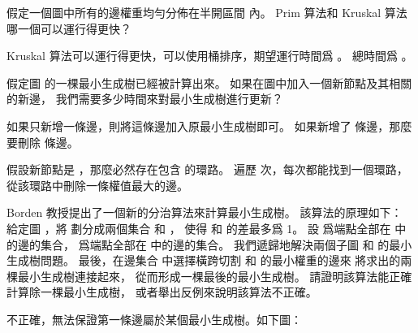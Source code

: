 \startEXERCISE\DIFFICULT
假定一個圖中所有的邊權重均勻分佈在半開區間 \m{[0,1)} 內。
 Prim 算法和 Kruskal 算法哪一個可以運行得更快？
\stopEXERCISE

\startANSWER
Kruskal 算法可以運行得更快，可以使用桶排序，期望運行時間爲 。
總時間爲 。
\stopANSWER

\startEXERCISE\DIFFICULT
假定圖  的一棵最小生成樹已經被計算出來。
如果在圖中加入一個新節點及其相關的新邊，
我們需要多少時間來對最小生成樹進行更新？
\stopEXERCISE

\startANSWER
如果只新增一條邊，則將這條邊加入原最小生成樹即可。
如果新增了  條邊，那麼要刪除  條邊。

假設新節點是 ，那麼必然存在包含  的環路。
遍歷  次，每次都能找到一個環路，從該環路中刪除一條權值最大的邊。
\stopANSWER

\startEXERCISE
Borden 教授提出了一個新的分治算法來計算最小生成樹。
該算法的原理如下：
給定圖 ，將  劃分成兩個集合  和 ，
使得  和  的差最多爲 1。
設  爲端點全部在  中的邊的集合，
  爲端點全部在  中的邊的集合。
我們遞歸地解決兩個子圖  和  的最小生成樹問題。
最後，在邊集合  中選擇橫跨切割  和  的最小權重的邊來
將求出的兩棵最小生成樹連接起來，
從而形成一棵最後的最小生成樹。
請證明該算法能正確計算除一棵最小生成樹，
或者舉出反例來說明該算法不正確。
\stopEXERCISE

\startANSWER
不正確，無法保證第一條邊屬於某個最小生成樹。如下圖：

\externalfigure[output/e23_2_8-1]
\stopANSWER

\stopsection
